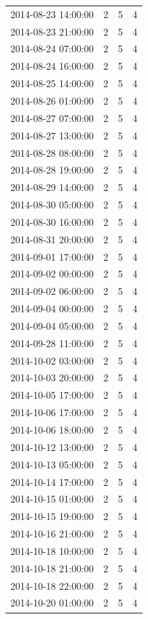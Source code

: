 \begin{tabular}{lrrr}
2014-08-23 14:00:00 & 2 & 5 & 4 \\
2014-08-23 21:00:00 & 2 & 5 & 4 \\
2014-08-24 07:00:00 & 2 & 5 & 4 \\
2014-08-24 16:00:00 & 2 & 5 & 4 \\
2014-08-25 14:00:00 & 2 & 5 & 4 \\
2014-08-26 01:00:00 & 2 & 5 & 4 \\
2014-08-27 07:00:00 & 2 & 5 & 4 \\
2014-08-27 13:00:00 & 2 & 5 & 4 \\
2014-08-28 08:00:00 & 2 & 5 & 4 \\
2014-08-28 19:00:00 & 2 & 5 & 4 \\
2014-08-29 14:00:00 & 2 & 5 & 4 \\
2014-08-30 05:00:00 & 2 & 5 & 4 \\
2014-08-30 16:00:00 & 2 & 5 & 4 \\
2014-08-31 20:00:00 & 2 & 5 & 4 \\
2014-09-01 17:00:00 & 2 & 5 & 4 \\
2014-09-02 00:00:00 & 2 & 5 & 4 \\
2014-09-02 06:00:00 & 2 & 5 & 4 \\
2014-09-04 00:00:00 & 2 & 5 & 4 \\
2014-09-04 05:00:00 & 2 & 5 & 4 \\
2014-09-28 11:00:00 & 2 & 5 & 4 \\
2014-10-02 03:00:00 & 2 & 5 & 4 \\
2014-10-03 20:00:00 & 2 & 5 & 4 \\
2014-10-05 17:00:00 & 2 & 5 & 4 \\
2014-10-06 17:00:00 & 2 & 5 & 4 \\
2014-10-06 18:00:00 & 2 & 5 & 4 \\
2014-10-12 13:00:00 & 2 & 5 & 4 \\
2014-10-13 05:00:00 & 2 & 5 & 4 \\
2014-10-14 17:00:00 & 2 & 5 & 4 \\
2014-10-15 01:00:00 & 2 & 5 & 4 \\
2014-10-15 19:00:00 & 2 & 5 & 4 \\
2014-10-16 21:00:00 & 2 & 5 & 4 \\
2014-10-18 10:00:00 & 2 & 5 & 4 \\
2014-10-18 21:00:00 & 2 & 5 & 4 \\
2014-10-18 22:00:00 & 2 & 5 & 4 \\
2014-10-20 01:00:00 & 2 & 5 & 4 \\

\end{tabular}
